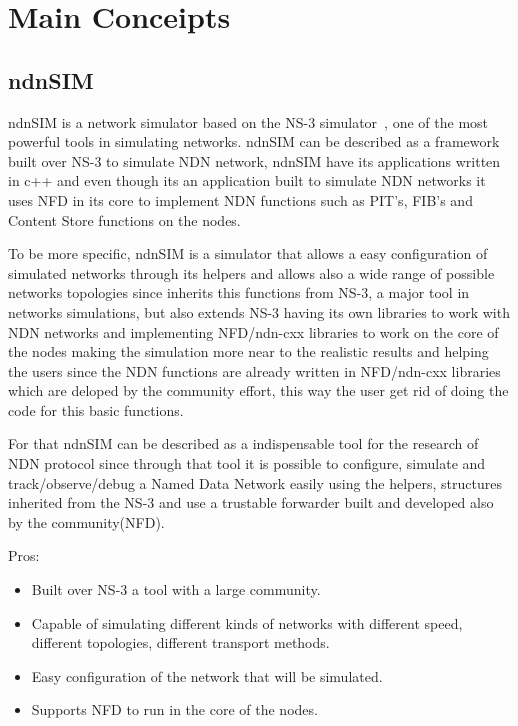 \documentclass[preprint,10pt]{elsarticle}
\begin{document}
\section{Main Conceipts}
\label{S:2}
\subsection{ndnSIM}
ndnSIM is a network simulator based on the NS-3 simulator~\cite{ndnSIM}, one of the most powerful tools in simulating networks. ndnSIM can be described as a framework built over NS-3 to simulate NDN network, ndnSIM have its applications written in c++ and even though its an application built to simulate NDN networks it uses NFD in its core to implement NDN functions such as PIT's, FIB's and Content Store functions on the nodes. \par
To be more specific, ndnSIM is a simulator that allows a easy configuration of simulated networks through its helpers and allows also a wide range of possible networks topologies since inherits this functions from NS-3, a major tool in networks simulations, but also extends NS-3 having its own libraries to work with NDN networks and implementing NFD/ndn-cxx libraries to work on the core of the nodes making the simulation more near to the realistic results and helping the users since the NDN functions are already written in NFD/ndn-cxx libraries which are deloped by the community effort, this way the user get rid of doing the code for this basic functions.\par  
For that ndnSIM can be described as a indispensable tool for the research of NDN protocol since through that tool it is possible to configure, simulate and track/observe/debug a Named Data Network easily using the helpers, structures inherited from the NS-3 and use a trustable forwarder built and developed also by the community(NFD).\par
Pros:
\begin{itemize}
		\item Built over NS-3 a tool with a large community.
		
		\item Capable of simulating different kinds of networks with different speed, different topologies, different transport methods.
		
		\item Easy configuration of the network that will be simulated.
		
		\item Supports NFD to run in the core of the nodes.
	\end{itemize}
\end{document}
